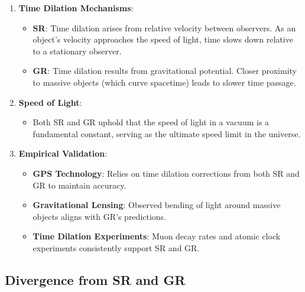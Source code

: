 \documentclass[12pt]{article}
\begin{document}
\begin{enumerate}
    \item \textbf{Time Dilation Mechanisms}:
    \begin{itemize}
        \item \textbf{SR}: Time dilation arises from relative velocity between observers. As an object's velocity approaches the speed of light, time slows down relative to a stationary observer.
        \item \textbf{GR}: Time dilation results from gravitational potential. Closer proximity to massive objects (which curve spacetime) leads to slower time passage.
    \end{itemize}
    
    \item \textbf{Speed of Light}:
    \begin{itemize}
        \item Both SR and GR uphold that the speed of light in a vacuum is a fundamental constant, serving as the ultimate speed limit in the universe.
    \end{itemize}
    
    \item \textbf{Empirical Validation}:
    \begin{itemize}
        \item \textbf{GPS Technology}: Relies on time dilation corrections from both SR and GR to maintain accuracy.
        \item \textbf{Gravitational Lensing}: Observed bending of light around massive objects aligns with GR's predictions.
        \item \textbf{Time Dilation Experiments}: Muon decay rates and atomic clock experiments consistently support SR and GR.
    \end{itemize}
\end{enumerate}

\subsection{Divergence from SR and GR}
\end{document}
